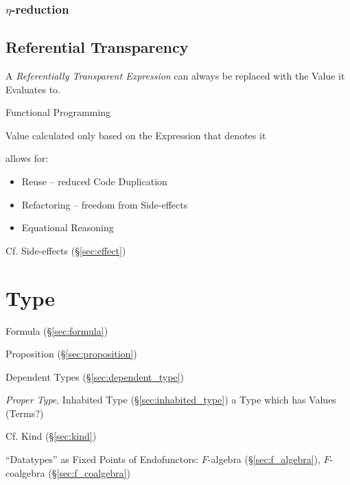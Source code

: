 \subsubsection{$\eta$-reduction}\label{sec:eta_reduction}



\subsection{Referential Transparency}\label{sec:referential_transparency}

A \emph{Referentially Transparent Expression} can always be replaced
with the Value it Evaluates to.

Functional Programming

Value calculated only based on the Expression that
denotes it

allows for:
\begin{itemize}
\item Reuse -- reduced Code Duplication
\item Refactoring -- freedom from Side-effects
\item Equational Reasoning
\end{itemize}

\fist Cf. Side-effects (\S\ref{sec:effect})



\section{Type}\label{sec:type}

Formula (\S\ref{sec:formula})

Proposition (\S\ref{sec:proposition})


Dependent Types (\S\ref{sec:dependent_type})

\emph{Proper Type}, Inhabited Type (\S\ref{sec:inhabited_type}) a Type
which has Values (Terms?)

\fist Cf. Kind (\S\ref{sec:kind})


``Datatypes'' as Fixed Points of Endofunctors: $F$-algebra
(\S\ref{sec:f_algebra}), $F$-coalgebra (\S\ref{sec:f_coalgebra})

